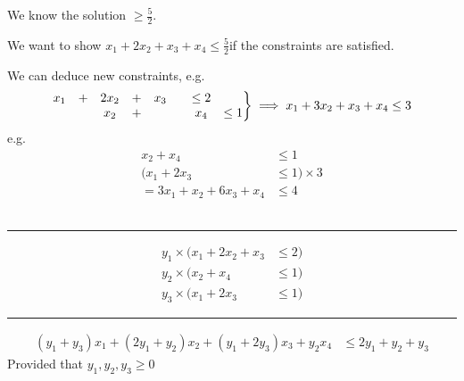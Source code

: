 \documentclass[12 pt]{article}
\newenvironment{rcases}
  {\left.\begin{aligned}}
  {\end{aligned}\right\rbrace}
\begin{document}
          We know the solution $\geq \frac{5}{2}$.

          We want to show $x_1 + 2x_2 + x_3 + x_4 \leq \frac{5}{2}$if
          the constraints are satisfied.

          We can deduce new constraints, e.g.
          \begin{align*}
            \begin{rcases}
              \begin{matrix}
                x_1 & + & 2x_2 & + & x_3 && \leq 2
                \\ && x_2 &+ & & & x_4 & \leq 1
              \end{matrix}
            \end{rcases} \implies x_1 + 3x_2 + x_3 + x_4 \leq 3
          \end{align*}
          e.g.
          \begin{align*}
            x_2 + x_4 & \leq 1
            \\ (x_1 + 2x_3 & \leq 1) \times 3
            \\ = 3x_1 + x_2 + 6x_3 + x_4 & \leq 4
          \end{align*}
          \\ \noindent \rule{\textwidth}{0.5pt}
          \begin{align*}
            y_1 \times (x_1 + 2x_2 + x_3 & \leq 2)
            \\ y_2 \times (x_2 + x_4 &\leq 1)
            \\ y_3 \times (x_1 + 2x_3 & \leq 1)
          \end{align*}
                                        {\noindent \rule{\textwidth}{0.5pt}}
          \begin{align*}
            (y_1 + y_3)x_1 + (2y_1+y_2)x_2 + (y_1 +2y_3)x_3 + y_2x_4 & \leq 2y_1 + y_2 + y_3
          \end{align*}
          Provided that $y_1,y_2,y_3 \geq 0$
\end{document}

